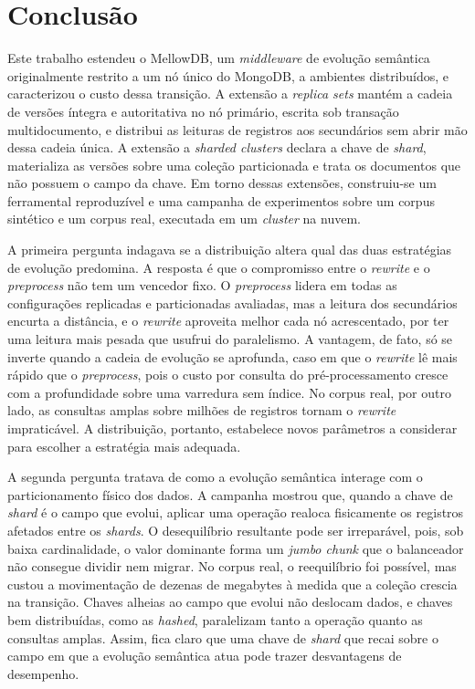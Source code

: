 \chapter{Conclusão}
\label{cap:conclusao}

Este trabalho estendeu o MellowDB, um \textit{middleware} de evolução semântica originalmente restrito a um nó único do MongoDB, a ambientes distribuídos, e caracterizou o custo dessa transição. A extensão a \textit{replica sets} mantém a cadeia de versões íntegra e autoritativa no nó primário, escrita sob transação multidocumento, e distribui as leituras de registros aos secundários sem abrir mão dessa cadeia única. A extensão a \textit{sharded clusters} declara a chave de \textit{shard}, materializa as versões sobre uma coleção particionada e trata os documentos que não possuem o campo da chave. Em torno dessas extensões, construiu-se um ferramental reproduzível e uma campanha de experimentos sobre um corpus sintético e um corpus real, executada em um \textit{cluster} na nuvem.

A primeira pergunta indagava se a distribuição altera qual das duas estratégias de evolução predomina. A resposta é que o compromisso entre o \textit{rewrite} e o \textit{preprocess} não tem um vencedor fixo. O \textit{preprocess} lidera em todas as configurações replicadas e particionadas avaliadas, mas a leitura dos secundários encurta a distância, e o \textit{rewrite} aproveita melhor cada nó acrescentado, por ter uma leitura mais pesada que usufrui do paralelismo. A vantagem, de fato, só se inverte quando a cadeia de evolução se aprofunda, caso em que o \textit{rewrite} lê mais rápido que o \textit{preprocess}, pois o custo por consulta do pré-processamento cresce com a profundidade sobre uma varredura sem índice. No corpus real, por outro lado, as consultas amplas sobre milhões de registros tornam o \textit{rewrite} impraticável. A distribuição, portanto, estabelece novos parâmetros a considerar para escolher a estratégia mais adequada.

A segunda pergunta tratava de como a evolução semântica interage com o particionamento físico dos dados. A campanha mostrou que, quando a chave de \textit{shard} é o campo que evolui, aplicar uma operação realoca fisicamente os registros afetados entre os \textit{shards}. O desequilíbrio resultante pode ser irreparável, pois, sob baixa cardinalidade, o valor dominante forma um \textit{jumbo chunk} que o balanceador não consegue dividir nem migrar. No corpus real, o reequilíbrio foi possível, mas custou a movimentação de dezenas de megabytes à medida que a coleção crescia na transição. Chaves alheias ao campo que evolui não deslocam dados, e chaves bem distribuídas, como as \textit{hashed}, paralelizam tanto a operação quanto as consultas amplas. Assim, fica claro que uma chave de \textit{shard} que recai sobre o campo em que a evolução semântica atua pode trazer desvantagens de desempenho.

